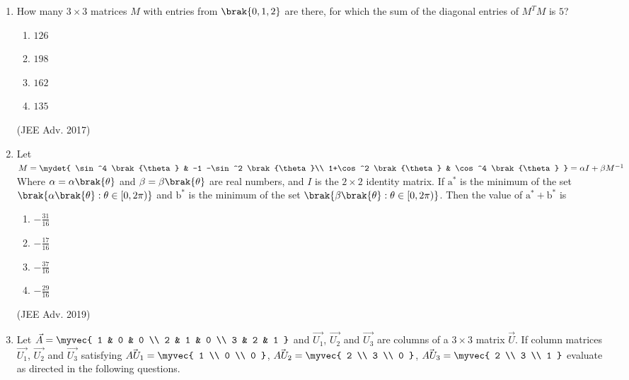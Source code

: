 \begin{enumerate}
    \item
        How many $3 \times 3$ matrices $M$ with entries from $\brak{0,1,2}$ are there, for which the sum of the diagonal entries of $M^TM$ is $5$?
            \begin{enumerate}
                \item $126$
                \item $198$
                \item $162$
                \item $135$
            \end{enumerate}
            \hfill (JEE Adv. 2017)
        \item
        Let $M= \mydet{
            \sin^4 \brak{\theta} & -1 -\sin^2 \brak{\theta}\\
            1+\cos^2 \brak{\theta} & \cos^4 \brak{\theta}
            } = 
            \alpha I + \beta M^{-1}$\\
        Where $\alpha = \alpha \brak{\theta}$ and $\beta = \beta \brak{\theta}$ are real numbers, and $I$ is the $2 \times 2$ identity matrix. If $\mathrm{a^*}$ is the minimum of the set $\brak{\alpha \brak{\theta} : \theta \in [0, 2 \pi)}$ and $\mathrm{b^*}$ is the minimum of the set $\brak{\beta \brak{\theta} : \theta \in [0, 2 \pi)}$. Then the value of $\mathrm{a^*} + \mathrm{b^*}$ is
            \begin{enumerate}
                \itemsep0.4em
                \item $-\frac{31}{16}$
                \item $-\frac{17}{16}$
                \item $-\frac{37}{16}$
                \item $-\frac{29}{16}$
            \end{enumerate}
            \hfill (JEE Adv. 2019)
	\item Let $\vec{A} = \myvec{
		1 & 0 & 0 \\
		2 & 1 & 0 \\
	3 & 2 & 1 }$ and $\vec{U_1}$, $\vec{U_2}$ and $\vec{U_3}$ are columns of a $3\times3$ matrix $\vec{U}$. If column matrices $\vec{U_1}$, $\vec{U_2}$ and $\vec{U_3}$ satisfying 
	$\vec{AU_1} = \myvec{
		1 \\
		0 \\
		0 }$,
	$\vec{AU_2} = \myvec{
		2 \\
		3 \\
		0 }$,
	$\vec{AU_3} = \myvec{
		2 \\
		3 \\
		1 }$ evaluate as directed in the following questions.


\end{enumerate}
